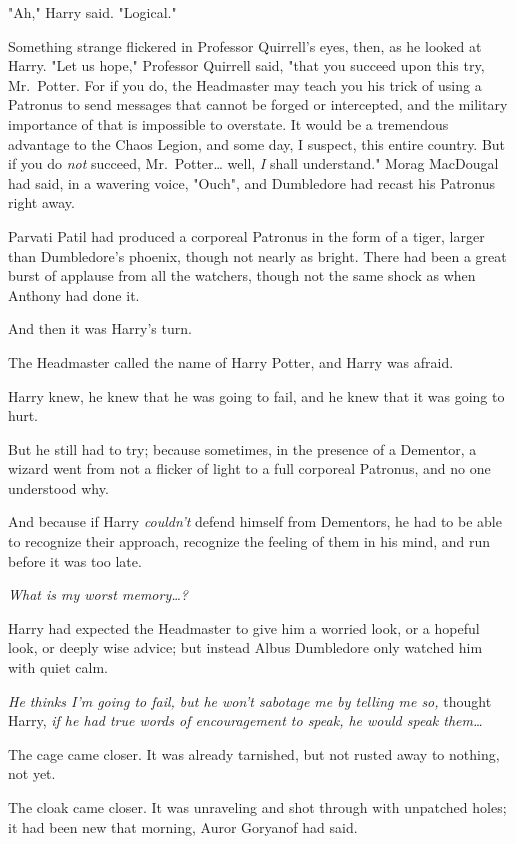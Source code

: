 "Ah," Harry said. "Logical."

Something strange flickered in Professor Quirrell's eyes, then, as he looked at
Harry. "Let us hope," Professor Quirrell said, "that you succeed upon this try,
Mr.~Potter. For if you do, the Headmaster may teach you his trick of using a
Patronus to send messages that cannot be forged or intercepted, and the
military importance of that is impossible to overstate. It would be a
tremendous advantage to the Chaos Legion, and some day, I suspect, this entire
country. But if you do \emph{not} succeed, Mr.~Potter{\ldots} well, \emph{I}
shall understand."
\later
Morag MacDougal had said, in a wavering voice, "Ouch", and Dumbledore had
recast his Patronus right away.

Parvati Patil had produced a corporeal Patronus in the form of a tiger, larger
than Dumbledore's phoenix, though not nearly as bright. There had been a great
burst of applause from all the watchers, though not the same shock as when
Anthony had done it.

And then it was Harry's turn.

The Headmaster called the name of Harry Potter, and Harry was afraid.

Harry knew, he knew that he was going to fail, and he knew that it was going to
hurt.

But he still had to try; because sometimes, in the presence of a Dementor, a
wizard went from not a flicker of light to a full corporeal Patronus, and no
one understood why.

And because if Harry \emph{couldn't} defend himself from Dementors, he had to
be able to recognize their approach, recognize the feeling of them in his mind,
and run before it was too late.

\emph{What is my worst memory{\ldots}?}

Harry had expected the Headmaster to give him a worried look, or a hopeful
look, or deeply wise advice; but instead Albus Dumbledore only watched him with
quiet calm.

\emph{He thinks I'm going to fail, but he won't sabotage me by telling me so,}
thought Harry, \emph{if he had true words of encouragement to speak, he would
speak them{\ldots}}

The cage came closer. It was already tarnished, but not rusted away to nothing,
not yet.

The cloak came closer. It was unraveling and shot through with unpatched holes;
it had been new that morning, Auror Goryanof had said.

